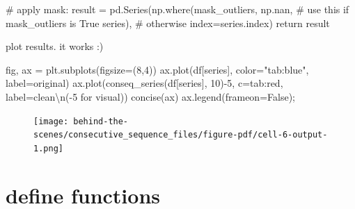 \documentclass[
  letterpaper,
  DIV=11,
  numbers=noendperiod,
  oneside]{scrreprt}
\newenvironment{Shaded}{\begin{snugshade}}{\end{snugshade}}
\newcommand{\CharTok}[1]{\textcolor[rgb]{0.13,0.47,0.30}{#1}}
\newcommand{\CommentTok}[1]{\textcolor[rgb]{0.37,0.37,0.37}{#1}}
\newcommand{\ControlFlowTok}[1]{\textcolor[rgb]{0.00,0.23,0.31}{#1}}
\newcommand{\DecValTok}[1]{\textcolor[rgb]{0.68,0.00,0.00}{#1}}
\newcommand{\NormalTok}[1]{\textcolor[rgb]{0.00,0.23,0.31}{#1}}
\newcommand{\OperatorTok}[1]{\textcolor[rgb]{0.37,0.37,0.37}{#1}}
\newcommand{\StringTok}[1]{\textcolor[rgb]{0.13,0.47,0.30}{#1}}
\newcommand{\VariableTok}[1]{\textcolor[rgb]{0.07,0.07,0.07}{#1}}
\begin{document}
\begin{Shaded}
\begin{Highlighting}[]
    \CommentTok{\# apply mask:}
\NormalTok{    result }\OperatorTok{=}\NormalTok{ pd.Series(np.where(mask\_outliers,}
\NormalTok{                                np.nan,  }\CommentTok{\# use this if mask\_outliers is True}
\NormalTok{                                series), }\CommentTok{\# otherwise}
\NormalTok{                            index}\OperatorTok{=}\NormalTok{series.index)}
    \ControlFlowTok{return}\NormalTok{ result}
\end{Highlighting}
\end{Shaded}

plot results. it works :)

\begin{Shaded}
\begin{Highlighting}[]
\NormalTok{fig, ax }\OperatorTok{=}\NormalTok{ plt.subplots(figsize}\OperatorTok{=}\NormalTok{(}\DecValTok{8}\NormalTok{,}\DecValTok{4}\NormalTok{))}
\NormalTok{ax.plot(df[}\StringTok{\textquotesingle{}series\textquotesingle{}}\NormalTok{], color}\OperatorTok{=}\StringTok{"tab:blue"}\NormalTok{, label}\OperatorTok{=}\StringTok{\textquotesingle{}original\textquotesingle{}}\NormalTok{)}
\NormalTok{ax.plot(conseq\_series(df[}\StringTok{\textquotesingle{}series\textquotesingle{}}\NormalTok{], }\DecValTok{10}\NormalTok{)}\OperatorTok{{-}}\DecValTok{5}\NormalTok{, c}\OperatorTok{=}\StringTok{\textquotesingle{}tab:red\textquotesingle{}}\NormalTok{, label}\OperatorTok{=}\StringTok{\textquotesingle{}clean}\CharTok{\textbackslash{}n}\StringTok{({-}5 for visual)\textquotesingle{}}\NormalTok{)}
\NormalTok{concise(ax)}
\NormalTok{ax.legend(frameon}\OperatorTok{=}\VariableTok{False}\NormalTok{)}\OperatorTok{;}
\end{Highlighting}
\end{Shaded}

\begin{figure}[H]

{\centering \texttt{[image: behind-the-scenes/consecutive\_sequence\_files/figure-pdf/cell-6-output-1.png]}

}

\end{figure}

\hypertarget{define-functions}{%
\chapter{define functions}\label{define-functions}}
\end{document}
